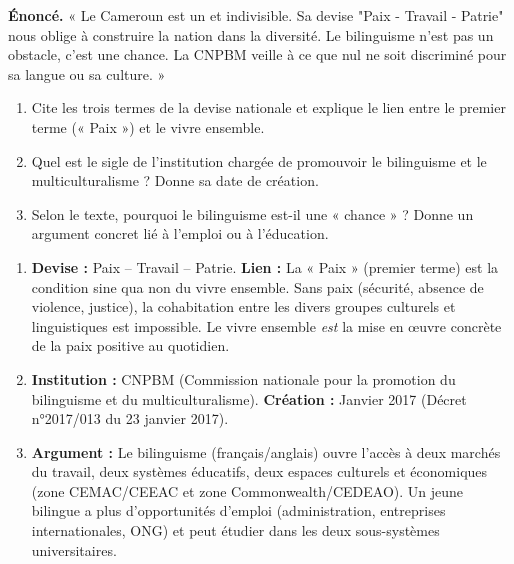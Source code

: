 \documentclass[11pt]{article}
\begin{document}
\begin{exercice}
\textbf{Énoncé.} « Le Cameroun est un et indivisible. Sa devise "Paix - Travail - Patrie" nous oblige à construire la nation dans la diversité. Le bilinguisme n'est pas un obstacle, c'est une chance. La CNPBM veille à ce que nul ne soit discriminé pour sa langue ou sa culture. »
\begin{enumerate}
\item Cite les trois termes de la devise nationale et explique le lien entre le premier terme (« Paix ») et le vivre ensemble.
\item Quel est le sigle de l'institution chargée de promouvoir le bilinguisme et le multiculturalisme ? Donne sa date de création.
\item Selon le texte, pourquoi le bilinguisme est-il une « chance » ? Donne un argument concret lié à l'emploi ou à l'éducation.
\end{enumerate}
\end{exercice}

\begin{corrige}
\begin{enumerate}
\item \textbf{Devise :} Paix – Travail – Patrie. \textbf{Lien :} La « Paix » (premier terme) est la condition sine qua non du vivre ensemble. Sans paix (sécurité, absence de violence, justice), la cohabitation entre les divers groupes culturels et linguistiques est impossible. Le vivre ensemble \emph{est} la mise en œuvre concrète de la paix positive au quotidien.
\item \textbf{Institution :} CNPBM (Commission nationale pour la promotion du bilinguisme et du multiculturalisme). \textbf{Création :} Janvier 2017 (Décret n°2017/013 du 23 janvier 2017).
\item \textbf{Argument :} Le bilinguisme (français/anglais) ouvre l'accès à deux marchés du travail, deux systèmes éducatifs, deux espaces culturels et économiques (zone CEMAC/CEEAC et zone Commonwealth/CEDEAO). Un jeune bilingue a plus d'opportunités d'emploi (administration, entreprises internationales, ONG) et peut étudier dans les deux sous-systèmes universitaires.
\end{enumerate}
\end{corrige}
\end{document}
